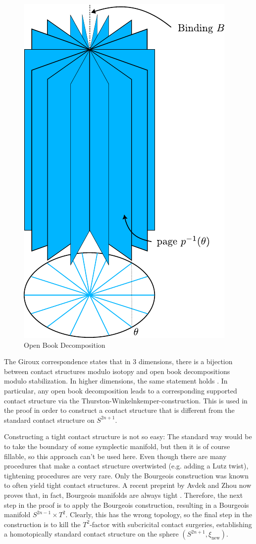 \begin{figure}
    \includegraphics{../images/open_book.pdf}
    \caption{Open Book Decomposition}
    \label{fig:open_book}
\end{figure}

The Giroux correspondence states that in 3 dimensions, there is a bijection between contact structures modulo isotopy
and open book decompositions modulo stabilization.
In higher dimensions, the same statement holds \cite{BHH23}. 
In particular, any open book decomposition leads to a corresponding supported
contact structure via the Thurston-Winkelnkemper-construction.
This is used in the proof in order to construct a contact structure that is different from the standard contact structure on $S^{2n+1}$.

Constructing a tight contact structure is not so easy: The standard way would be to take the boundary of some symplectic manifold,
but then it is of course fillable, so this approach can't be used here.
Even though there are many procedures that make a contact structure overtwisted (e.g. adding a Lutz twist), tightening procedures are very rare.
Only the Bourgeois construction was known to often yield tight contact structures. 
A recent preprint by Avdek and Zhou now proves that, in fact, Bourgeois manifolds are always tight \cite{BGM22, AZ24}.
Therefore, the next step in the proof is to apply the Bourgeois construction, resulting in a Bourgeois manifold $S^{2n-1} \times T^2$.
Clearly, this has the wrong topology, so the final step in the construction is to kill the $T^2$-factor with
subcricital contact surgeries, establishing a homotopically standard contact structure on the sphere $(S^{2n+1},\xi_\text{new})$.

